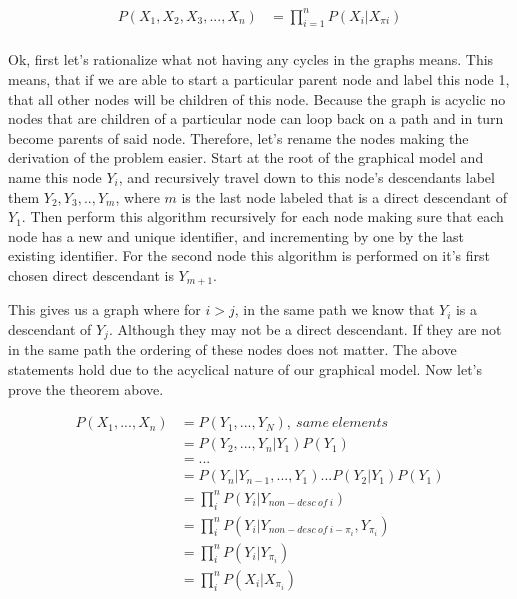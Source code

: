 \documentclass[paper=a4, fontsize=11pt]{scrartcl} %
\begin{document}
\begin{align}
P(X_1,X_2,X_3,...,X_n) &= \prod_{i=1}^n P(X_i|X_{\pi i}) \\
\end{align}

Ok, first let's rationalize what not having any cycles in the graphs means.  This means, that if we are able to start a particular parent node and label this node 1, that all other nodes will be children of this node.
Because the graph is acyclic no nodes that are children of a particular node can loop back on a path and in turn become parents of said node.  
Therefore, let's rename the nodes making the derivation of the problem easier.
Start at the root of the graphical model and name this node $Y_i$, and recursively travel down to this node's descendants label them $Y_2,Y_3,..,Y_m$, where $m$ is the last node labeled that is a direct descendant of $Y_1$.  
Then perform this algorithm recursively for each node making sure that each node has a new and unique identifier, and incrementing by one by the last existing identifier.
For the second node this algorithm is performed on it's first chosen direct descendant is $Y_{m+1}$.

This gives us a graph where for $i > j$, in the same path we know that $Y_i$ is a descendant of $Y_j$.  
Although they may not be a direct descendant.
If they are not in the same path the ordering of these nodes does not matter.
The above statements hold due to the acyclical nature of our graphical model.
Now let's prove the theorem above.

\begin{align}
P(X_1,...,X_n) &= P(Y_1,...,Y_N), \ same \ elements \\
&= P(Y_2,...,Y_n|Y_1)P(Y_1) \\
&=... \\
&= P(Y_n|Y_{n-1},...,Y_1)...P(Y_2|Y_1)P(Y_1) \\
&= \prod_i^n P(Y_i|Y_{non-desc\ of\ i}) \\
&= \prod_i^n P(Y_i|Y_{non-desc\ of\ i-\pi_i},Y_{\pi_i}) \\
&= \prod_i^n P(Y_i|Y_{\pi_i}) \\
&= \prod_i^n P(X_i|X_{\pi_i}) \\
\end{align}


\end{document}
